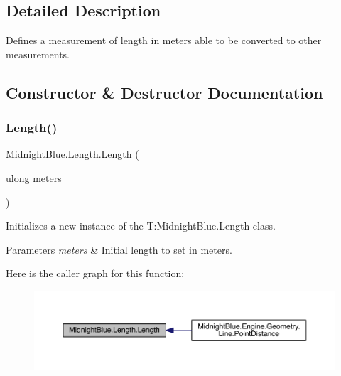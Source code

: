 \subsection{Detailed Description}
Defines a measurement of length in meters able to be converted to other measurements. 



\subsection{Constructor \& Destructor Documentation}
\hypertarget{class_midnight_blue_1_1_length_a8c58b161c6f730c22d84b01b078bd091}{}\label{class_midnight_blue_1_1_length_a8c58b161c6f730c22d84b01b078bd091} 
\subsubsection{\texorpdfstring{Length()}{Length()}}
{\footnotesize\ttfamily Midnight\+Blue.\+Length.\+Length (\begin{DoxyParamCaption}\item[{ulong}]{meters }\end{DoxyParamCaption})\hspace{0.3cm}{\ttfamily [inline]}}



Initializes a new instance of the T\+:\+Midnight\+Blue.\+Length class. 


\begin{DoxyParams}{Parameters}
{\em meters} & Initial length to set in meters.\\
\hline
\end{DoxyParams}
Here is the caller graph for this function\+:
\nopagebreak
\begin{figure}[H]
\begin{center}
\leavevmode
\includegraphics[width=350pt]{class_midnight_blue_1_1_length_a8c58b161c6f730c22d84b01b078bd091_icgraph}
\end{center}
\end{figure}


